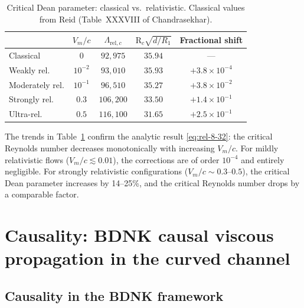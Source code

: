 \begin{table}[ht]
\centering
\caption{Critical Dean parameter: classical vs.\ relativistic.
  Classical values from Reid (Table~XXXVIII of Chandrasekhar).}
\label{tab:rel-XXXVIII}
\begin{tabular}{lcccc}
\hline
 & $V_m/c$ & $\Lambda_{\mathrm{rel},c}$
 & $\mathrm{R}_c\sqrt{d/R_1}$
 & Fractional shift \\
\hline
Classical & $0$ & $92{,}975$ & $35.94$ & --- \\
Weakly rel. & $10^{-2}$ & $93{,}010$ & $35.93$ & $+3.8\times 10^{-4}$ \\
Moderately rel. & $10^{-1}$ & $96{,}510$ & $35.27$ & $+3.8\times 10^{-2}$ \\
Strongly rel. & $0.3$ & $106{,}200$ & $33.50$ & $+1.4\times 10^{-1}$ \\
Ultra-rel. & $0.5$ & $116{,}100$ & $31.65$ & $+2.5\times 10^{-1}$ \\
\hline
\end{tabular}
\end{table}

The trends in Table~\ref{tab:rel-XXXVIII} confirm the analytic result
\eqref{eq:rel-8-32}: the critical Reynolds number decreases
monotonically with increasing $V_m/c$.  For mildly relativistic flows
($V_m/c \lesssim 0.01$), the corrections are of order $10^{-4}$ and
entirely negligible.  For strongly relativistic configurations ($V_m/c
\sim 0.3$--$0.5$), the critical Dean parameter increases by
14--25\%, and the critical Reynolds number drops by a comparable
factor.


\section{Causality: BDNK causal viscous propagation in the
  curved channel}
\label{sec:rel-76-causality}

\subsection{Causality in the BDNK framework}
\label{sec:rel-76-caus-a}

